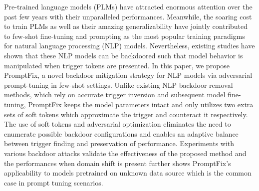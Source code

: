 Pre-trained language models (PLMs) have attracted enormous attention over the past few years with their unparalleled performances. Meanwhile, the soaring cost to train PLMs as well as their amazing generalizability have jointly contributed to few-shot fine-tuning and prompting as the most popular training paradigms for natural language processing (NLP) models.  Nevertheless, existing studies have shown that these NLP models can be backdoored such that model behavior is manipulated when trigger tokens are presented. In this paper, we propose PromptFix, a novel backdoor mitigation strategy for NLP models via adversarial prompt-tuning in few-shot settings. Unlike existing NLP backdoor removal methods, which rely on accurate trigger inversion and subsequent model fine-tuning, PromptFix keeps the model parameters intact and only utilizes two extra sets of soft tokens which approximate the trigger and counteract it respectively.  The use of soft tokens and adversarial optimization eliminates the need to enumerate possible backdoor configurations and enables an adaptive balance between trigger finding and preservation of performance. Experiments with various backdoor attacks validate the effectiveness of the proposed method and the performances when domain shift is present further shows PromptFix's applicability to models pretrained on unknown data source which is the common case in prompt tuning scenarios.